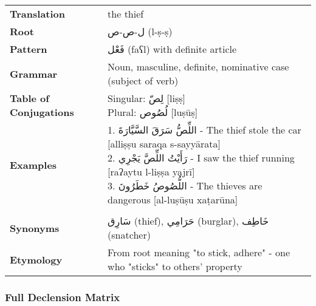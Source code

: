 \documentclass[letter,12pt]{article}
\begin{document}
\begin{tabular}{p{3cm}p{10cm}}
\toprule
\textbf{Translation} & the thief \\
\textbf{Root} & \textarabic{ل-ص-ص} (l-ṣ-ṣ) \\
\textbf{Pattern} & \textarabic{فَعْل} (faʕl) with definite article \\
\textbf{Grammar} & Noun, masculine, definite, nominative case (subject of verb) \\
\textbf{Table of Conjugations} & \makecell[l]{
Singular: \textarabic{لِصّ} [liṣṣ]\\
Plural: \textarabic{لُصُوص} [luṣūṣ]
} \\
\textbf{Examples} & \makecell[l]{\parbox{9.5cm}{
1. \textarabic{اللِّصُّ سَرَقَ السَّيَّارَةَ} - The thief stole the car [alliṣṣu saraqa s-sayyārata]\\
2. \textarabic{رَأَيْتُ اللِّصَّ يَجْرِي} - I saw the thief running [raʔaytu l-liṣṣa yajrī]\\
3. \textarabic{اللُّصُوصُ خَطَرُونَ} - The thieves are dangerous [al-luṣūṣu xaṭarūna]
}} \\
\midrule \\
\textbf{Synonyms} & \textarabic{سَارِق} (thief), \textarabic{حَرَامِي} (burglar), \textarabic{خَاطِف} (snatcher) \\
\textbf{Etymology} & From root meaning "to stick, adhere" - one who "sticks" to others' property \\
\bottomrule
\end{tabular}

\subsubsection*{Full Declension Matrix}
\end{document}
